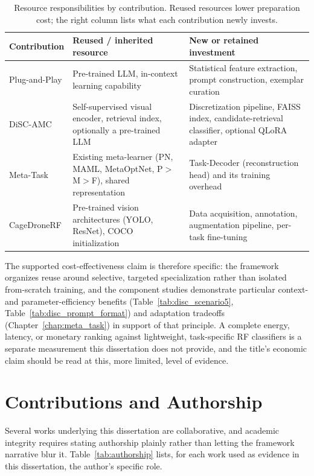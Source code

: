 \begin{table}[htbp]
\centering
\caption{Resource responsibilities by contribution. Reused resources lower preparation cost; the right column lists what each contribution newly invests.}
\label{tab:resource_responsibilities}
\small
\begin{tabular}{p{}p{}p{}}
\toprule
Contribution & Reused / inherited resource & New or retained investment \\
\midrule
Plug-and-Play & Pre-trained LLM, in-context learning capability & Statistical feature extraction, prompt construction, exemplar curation \\
DiSC-AMC & Self-supervised visual encoder, retrieval index, optionally a pre-trained LLM & Discretization pipeline, FAISS index, candidate-retrieval classifier, optional QLoRA adapter \\
Meta-Task & Existing meta-learner (PN, MAML, MetaOptNet, P$>$M$>$F), shared representation & Task-Decoder (reconstruction head) and its training overhead \\
CageDroneRF & Pre-trained vision architectures (YOLO, ResNet), COCO initialization & Data acquisition, annotation, augmentation pipeline, per-task fine-tuning \\
\bottomrule
\end{tabular}
\end{table}

The supported cost-effectiveness claim is therefore specific: the framework organizes reuse around selective, targeted specialization rather than isolated from-scratch training, and the component studies demonstrate particular context- and parameter-efficiency benefits (Table~\ref{tab:disc_scenario5}, Table~\ref{tab:disc_prompt_format}) and adaptation tradeoffs (Chapter~\ref{chap:meta_task}) in support of that principle. A complete energy, latency, or monetary ranking against lightweight, task-specific RF classifiers is a separate measurement this dissertation does not provide, and the title's economic claim should be read at this, more limited, level of evidence.

\section{Contributions and Authorship}
\label{sec:authorship}

Several works underlying this dissertation are collaborative, and academic integrity requires stating authorship plainly rather than letting the framework narrative blur it. Table~\ref{tab:authorship} lists, for each work used as evidence in this dissertation, the author's specific role.

